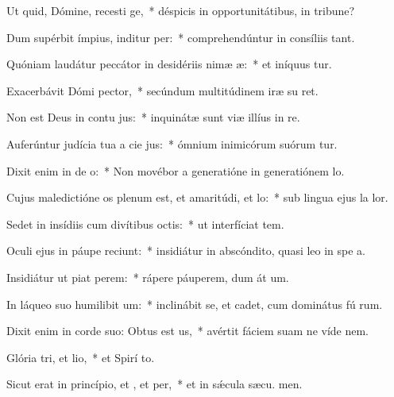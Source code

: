 \item Ut quid, Dómine, recesti ge,~* déspicis in opportunitátibus, in tribune?
\item Dum supérbit ímpius, inditur per:~* comprehendúntur in consíliis  tant.
\item Quóniam laudátur peccátor in desidériis nimæ æ:~* et iníquus tur.
\item Exacerbávit Dómi pector,~* secúndum multitúdinem iræ su  ret.
\item Non est Deus in contu jus:~* inquinátæ sunt viæ illíus in  re.
\item Auferúntur judícia tua a cie jus:~* ómnium inimicórum suórum tur.
\item Dixit enim in de o:~* Non movébor a generatióne in generatiónem  lo.
\item Cujus maledictióne os plenum est, et amaritúdi, et lo:~* sub lingua ejus la  lor.
\item Sedet in insídiis cum divítibus  octis:~* ut interfíciat tem.
\item Oculi ejus in páupe reciunt:~* insidiátur in abscóndito, quasi leo in spe a.
\item Insidiátur ut piat perem:~* rápere páuperem, dum át um.
\item In láqueo suo humilibit um:~* inclinábit se, et cadet, cum dominátus fú rum.
\item Dixit enim in corde suo: Obtus est us,~* avértit fáciem suam ne víde  nem.
\item Glória tri, et lio,~* et Spirí to.
\item Sicut erat in princípio, et , et per,~* et in sǽcula sæcu. men.
